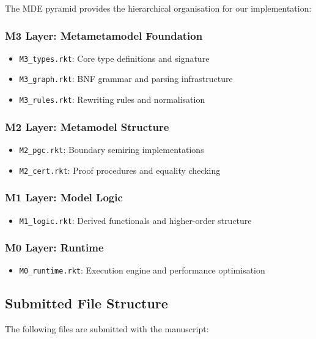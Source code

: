 The MDE pyramid provides the hierarchical organisation for our implementation:

\subsubsection{M3 Layer: Metametamodel Foundation}
\begin{itemize}
\item \texttt{M3\_types.rkt}: Core type definitions and signature
\item \texttt{M3\_graph.rkt}: BNF grammar and parsing infrastructure
\item \texttt{M3\_rules.rkt}: Rewriting rules and normalisation
\end{itemize}

\subsubsection{M2 Layer: Metamodel Structure}
\begin{itemize}
\item \texttt{M2\_pgc.rkt}: Boundary semiring implementations
\item \texttt{M2\_cert.rkt}: Proof procedures and equality checking
\end{itemize}

\subsubsection{M1 Layer: Model Logic}
\begin{itemize}
\item \texttt{M1\_logic.rkt}: Derived functionals and higher-order structure
\end{itemize}

\subsubsection{M0 Layer: Runtime}
\begin{itemize}
\item \texttt{M0\_runtime.rkt}: Execution engine and performance optimisation
\end{itemize}

\subsection{Submitted File Structure}

The following files are submitted with the manuscript:

